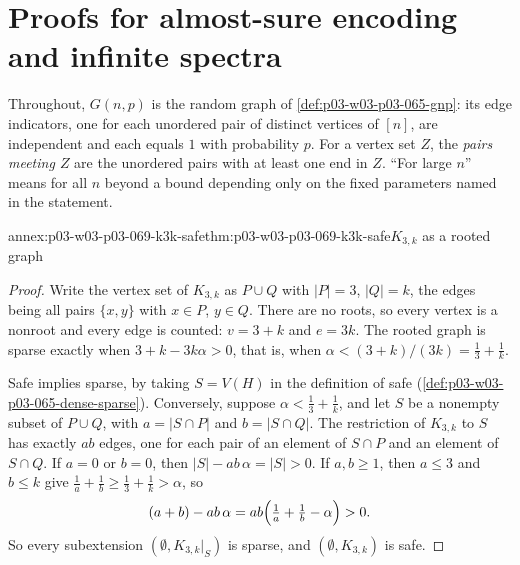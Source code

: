 \section{Proofs for almost-sure encoding and infinite spectra}
\label{sec:annex-p03-w03-p03-069-infinite-spectra}

Throughout, \(G(n,p)\) is the random graph of \cref{def:p03-w03-p03-065-gnp}:
its edge indicators, one for each unordered pair of distinct vertices of
\([n]\), are independent and each equals \(1\) with probability \(p\).  For a
vertex set \(Z\), the \emph{pairs meeting \(Z\)} are the unordered pairs with
at least one end in \(Z\).  ``For large \(n\)'' means for all \(n\) beyond a
bound depending only on the fixed parameters named in the statement.

\begin{annexitem}{annex:p03-w03-p03-069-k3k-safe}{thm:p03-w03-p03-069-k3k-safe}{\(K_{3,k}\) as a rooted graph}
\begin{proof}
Write the vertex set of \(K_{3,k}\) as \(P\cup Q\) with \(|P|=3\),
\(|Q|=k\), the edges being all pairs \(\{x,y\}\) with \(x\in P\), \(y\in Q\).
There are no roots, so every vertex is a nonroot and every edge is counted:
\(v=3+k\) and \(e=3k\).  The rooted graph is sparse exactly when
\(3+k-3k\alpha>0\), that is, when
\(\alpha<(3+k)/(3k)=\tfrac13+\tfrac1k\).

Safe implies sparse, by taking \(S=V(H)\) in the definition of safe
(\cref{def:p03-w03-p03-065-dense-sparse}).  Conversely, suppose
\(\alpha<\tfrac13+\tfrac1k\), and let \(S\) be a nonempty subset of
\(P\cup Q\), with \(a=|S\cap P|\) and \(b=|S\cap Q|\).  The restriction of
\(K_{3,k}\) to \(S\) has exactly \(ab\) edges, one for each pair of an element
of \(S\cap P\) and an element of \(S\cap Q\).  If \(a=0\) or \(b=0\), then
\(|S|-ab\,\alpha=|S|>0\).  If \(a,b\geq1\), then \(a\leq3\) and \(b\leq k\)
give \(\tfrac1a+\tfrac1b\geq\tfrac13+\tfrac1k>\alpha\), so
\[
  (a+b)-ab\,\alpha=ab\Bigl(\tfrac1a+\tfrac1b-\alpha\Bigr)>0 .
\]
So every subextension \((\emptyset,K_{3,k}|_S)\) is sparse, and
\((\emptyset,K_{3,k})\) is safe.
\end{proof}
\end{annexitem}

